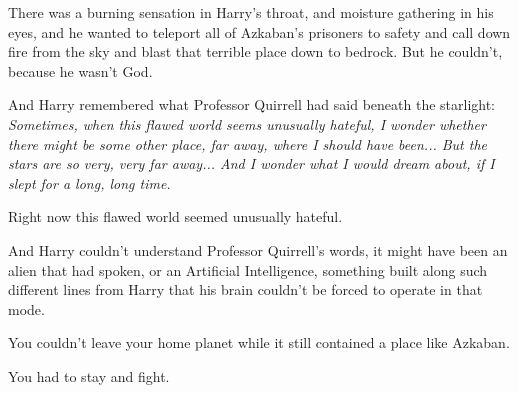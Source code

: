 There was a burning sensation in Harry's throat, and moisture gathering
in his eyes, and he wanted to teleport all of Azkaban's prisoners to
safety and call down fire from the sky and blast that terrible place
down to bedrock. But he couldn't, because he wasn't God.

And Harry remembered what Professor Quirrell had said beneath the
starlight: \emph{Sometimes, when this flawed world seems unusually
hateful, I wonder whether there might be some other place, far away,
where I should have been... But the stars are so very, very far
away... And I wonder what I would dream about, if I slept for a
long, long time.}

Right now this flawed world seemed unusually hateful.

And Harry couldn't understand Professor Quirrell's words, it might have
been an alien that had spoken, or an Artificial Intelligence, something
built along such different lines from Harry that his brain couldn't be
forced to operate in that mode.

You couldn't leave your home planet while it still contained a place
like Azkaban.

You had to stay and fight.

